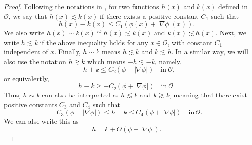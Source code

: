\documentclass[11pt]{amsart}
\numberwithin{theorem}{section}
\numberwithin{equation}{section}
\begin{document}
\begin{proof}
Following the notations in \cite{Caffarelli-Friedman1985, Korevaar-Lewis1987}, for two functions $h(x)$ and $k(x)$ defined in $\mathcal{O}$, we say that $h(x)\lesssim k(x)$ if there exists a positive constant $C_1$ such that $$h(x)-k(x)\leq C_1(\phi(x)+|\nabla\phi|(x)). $$ We also write $h(x)\sim k(x)$ if $h(x)\lesssim k(x)$ and $k(x)\lesssim h(x)$. Next, we write $h\lesssim k$ if the above inequality holds for any $x\in\mathcal{O}$, with constant $C_1$ independent of $x$. Finally, $h\sim k$ means $h\lesssim k$ and $k\lesssim h$. In a similar way, we will also use the notation $h\gtrsim k$ which means $-h\lesssim -k$, namely, $$-h+k\leq C_2(\phi+|\nabla\phi|)\quad \mathrm{in}\ \mathcal{O}, $$ or equivalently, $$h-k\geq-C_2(\phi+|\nabla\phi|)\quad \mathrm{in}\ \mathcal{O}. $$ Thus, $h\sim k$ can also be interpreted as $h\lesssim k$ and $h\gtrsim k$, meaning that there exist positive constants $C_3$ and $C_4$ such that $$-C_3(\phi+|\nabla\phi|) \leq h-k \leq C_4(\phi+|\nabla\phi|) \quad \mathrm{in} \ \mathcal{O}. $$ We can also write this as $$h=k+O(\phi+|\nabla\phi|). $$
 

\end{proof}
\end{document}
